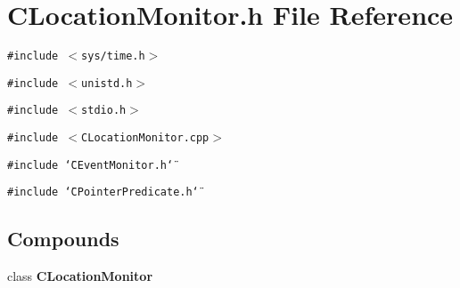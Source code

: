 \section{CLocation\-Monitor.h File Reference}
\label{CLocationMonitor_8h}
{\tt \#include $<$sys/time.h$>$}\par
{\tt \#include $<$unistd.h$>$}\par
{\tt \#include $<$stdio.h$>$}\par
{\tt \#include $<$CLocation\-Monitor.cpp$>$}\par
{\tt \#include \char`\"{}CEvent\-Monitor.h\char`\"{}}\par
{\tt \#include \char`\"{}CPointer\-Predicate.h\char`\"{}}\par
\subsection*{Compounds}
\begin{CompactItemize}
\item 
class {\bf CLocation\-Monitor}
\end{CompactItemize}

